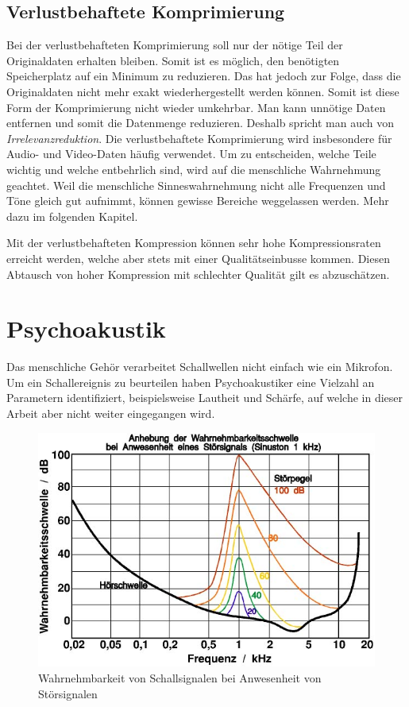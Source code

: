 \begin{refsection}
\subsection{Verlustbehaftete Komprimierung}
Bei der verlustbehafteten Komprimierung soll nur der nötige Teil der Originaldaten erhalten bleiben.
Somit ist es möglich, den benötigten Speicherplatz auf ein Minimum zu reduzieren.
Das hat jedoch zur Folge, dass die Originaldaten nicht mehr exakt wiederhergestellt werden können. 
Somit ist diese Form der Komprimierung nicht wieder umkehrbar.
Man kann unnötige Daten entfernen und somit die Datenmenge reduzieren.
Deshalb spricht man auch von {\em Irrelevanzreduktion}.
%
Die verlustbehaftete Komprimierung wird insbesondere für Audio- und Video-Daten häufig verwendet.
Um zu entscheiden, welche Teile wichtig und welche entbehrlich sind, wird auf die menschliche Wahrnehmung geachtet.
Weil die menschliche Sinneswahrnehmung nicht alle Frequenzen und Töne gleich gut aufnimmt, können gewisse Bereiche weggelassen werden.
Mehr dazu im folgenden Kapitel.

Mit der verlustbehafteten Kompression können sehr hohe Kompressionsraten erreicht werden, welche aber stets mit einer Qualitätseinbusse kommen.
Diesen Abtausch von hoher Kompression mit schlechter Qualität gilt es abzuschätzen.

\section{Psychoakustik}
%
\label{chapter:Psychoakustik}
Das menschliche Gehör verarbeitet Schallwellen nicht einfach wie ein Mikrofon.
Um ein Schallereignis zu beurteilen haben Psychoakustiker eine Vielzahl an Parametern identifiziert, beispielsweise Lautheit und Schärfe, auf welche in dieser Arbeit aber nicht weiter eingegangen wird.
%
%

\begin{figure}
	\centering
	\includegraphics[width=0.6\linewidth]{papers/compress/Bilder/Akustik_Mithoerschwelle2}
	\caption{Wahrnehmbarkeit von Schallsignalen bei Anwesenheit von Störsignalen \cite{skript:Akustik2}}
	\label{fig:Wahrnehmbarkeitsschwelle}
\end{figure}


\end{refsection}
